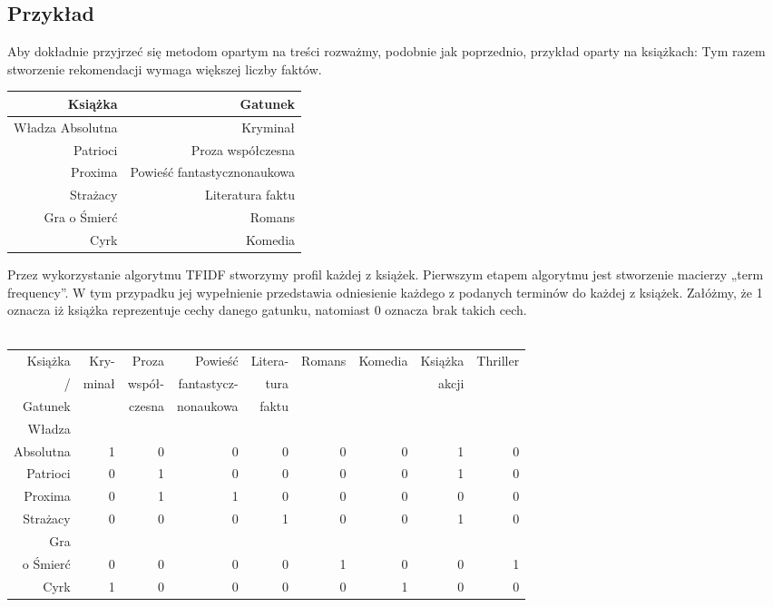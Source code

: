 \documentclass[12pt,a4paper]{report}
\begin{document}
\subsection{Przykład}
Aby dokładnie przyjrzeć się metodom opartym na treści rozważmy, podobnie jak poprzednio, przykład oparty na książkach:
Tym razem stworzenie rekomendacji wymaga większej liczby faktów.
\begin{center}
\begin{tabular}{|r|r|} \hline
\textbf{Książka} & \textbf{Gatunek} \\
\hline 
Władza Absolutna & Kryminał  \\
\hline 
Patrioci & Proza współczesna \\
\hline 
Proxima & Powieść fantastycznonaukowa \\
\hline 
Strażacy & Literatura faktu \\
\hline 
Gra o Śmierć & Romans \\
\hline 
Cyrk & Komedia \\
\hline
\end{tabular}
\end{center}
Przez wykorzystanie algorytmu TFIDF stworzymy profil każdej z książek.
Pierwszym etapem algorytmu jest stworzenie macierzy „term frequency”. W tym przypadku jej wypełnienie przedstawia odniesienie każdego z podanych terminów do każdej z książek. Załóżmy, że 1 oznacza iż książka reprezentuje cechy danego gatunku, natomiast 0 oznacza brak takich cech. 
\\
\\
\footnotesize{
\begin{tabular}{|r|r|r|r|r|r|r|r|r|} \hline
Książka  & Kry- & Proza &  Powieść & Litera- & Romans & Komedia & Książka & Thriller\\
/ & minał & współ- &  fantastycz- & tura &  &  & akcji & \\
Gatunek & & czesna &  nonaukowa & faktu &  &  &  & \\
\hline \hline 
Władza & &  &  &  &  & &  &  \\
Absolutna & 1 & 0 & 0 & 0 & 0 & 0 & 1 & 0 \\
Patrioci & 0 & 1 & 0 & 0 & 0 & 0 & 1 & 0 \\
Proxima & 0 & 1 & 1 & 0 & 0 & 0 & 0 & 0 \\
Strażacy & 0 & 0 & 0 & 1 & 0 & 0 & 1 & 0 \\
Gra & &  &  &  &  & &  &  \\
o Śmierć & 0 & 0 & 0 & 0 & 1 & 0 & 0 & 1 \\
Cyrk & 1 & 0 & 0 & 0 & 0 & 1 & 0 & 0\\
\hline
\end{tabular}
}
\end{document}
